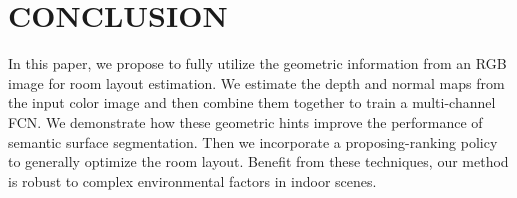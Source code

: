 \section{CONCLUSION}
\label{sec:Con}

In this paper, we propose to fully utilize the geometric information from an RGB image for room layout estimation. We estimate the depth and normal maps from the input color image and then combine them together to train a multi-channel FCN. We demonstrate how these geometric hints improve the performance of semantic surface segmentation. Then we incorporate a proposing-ranking policy to generally optimize the room layout. Benefit from these techniques, our method is robust to complex environmental factors in indoor scenes.